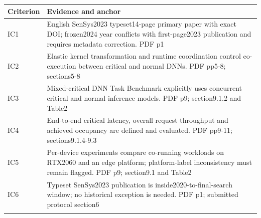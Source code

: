 \begin{longtable}{>{\raggedright\arraybackslash}p{}>{\raggedright\arraybackslash}p{}}
\toprule
\textbf{Criterion} & \textbf{Evidence and anchor}\\\midrule\endhead
IC1 & English SenSys2023 typeset14-page primary paper with exact DOI;\allowbreak{} frozen2024 year conflicts with first-page2023 publication and requires metadata correction. PDF p1\\\addlinespace
IC2 & Elastic kernel transformation and runtime coordination control co-execution between critical and normal DNNs. PDF pp5-8;\allowbreak{} sections5-8\\\addlinespace
IC3 & Mixed-critical DNN Task Benchmark explicitly uses concurrent critical and normal inference models. PDF p9;\allowbreak{} section9.1.2 and Table2\\\addlinespace
IC4 & End-to-end critical latency,\allowbreak{} overall request throughput and achieved occupancy are defined and evaluated. PDF pp9-11;\allowbreak{} sections9.1.4-9.3\\\addlinespace
IC5 & Per-device experiments compare co-running workloads on RTX2060 and an edge platform;\allowbreak{} platform-label inconsistency must remain flagged. PDF p9;\allowbreak{} section9.1 and Table2\\\addlinespace
IC6 & Typeset SenSys2023 publication is inside2020-to-final-search window;\allowbreak{} no historical exception is needed. PDF p1;\allowbreak{} submitted protocol section6\\\addlinespace
\bottomrule\end{longtable}
